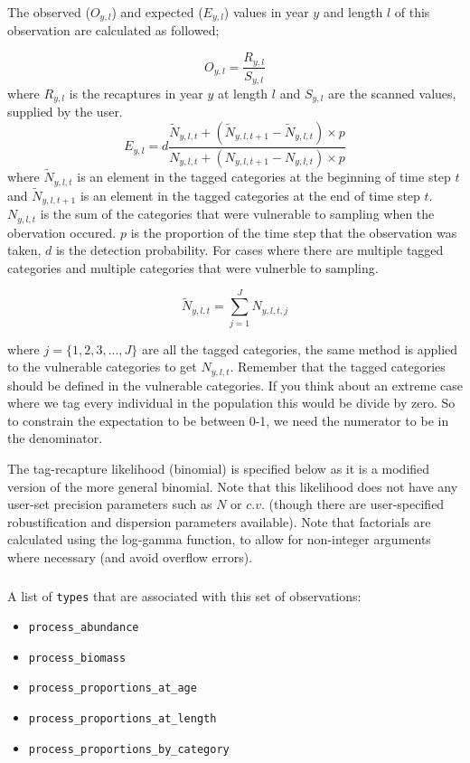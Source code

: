 The observed ($O_{y,l}$) and expected ($E_{y,l}$) values in year $y$ and length $l$ of this observation are calculated as followed;

\begin{equation}
O_{y,l} = \frac{R_{y,l}}{S_{y,l}}
\end{equation}
where $R_{y,l}$ is the recaptures in year $y$ at length $l$ and $S_{y,l}$ are the scanned values, supplied by the user.
\begin{equation}
E_{y,l} = d \frac{\tilde{N}_{y,l,t} +  (\tilde{N}_{y,l,t + 1} - \tilde{N}_{y,l,t}) \times p}
{N_{y,l,t} + (N_{y,l,t+1} - N_{y,l,t}) \times p} 
\end{equation}
where $\tilde{N}_{y,l,t}$ is an element in the tagged categories at the beginning of time step $t$ and $\tilde{N}_{y,l,t + 1}$ is an element in the tagged categories at the end of time step $t$. $N_{y,l,t}$ is the sum of the categories that were vulnerable to sampling when the obervation occured. $p$ is the proportion of the time step that the observation was taken, $d$ is the detection probability. For cases where there are multiple tagged categories and multiple categories that were vulnerble to sampling.

\begin{equation}
	\tilde{N}_{y,l,t} = \sum_{j = 1}^{J} N_{y,l,t,j}
\end{equation}

where $j = \{1,2,3,...,J\}$  are all the tagged categories, the same method is applied to the vulnerable categories to get $N_{y,l,t}$. Remember that the tagged categories should be defined in the vulnerable categories. If you think about an extreme case where we tag every individual in the population this would be divide by zero. So to constrain the expectation to be between 0-1, we need the numerator to be in the denominator.

The tag-recapture likelihood (binomial) is specified below as it is a modified version of the more general binomial. Note that this likelihood does not have any user-set precision parameters such as $N$ or $c.v.$ (though there are user-specified robustification and dispersion parameters available). Note that factorials are calculated using the log-gamma function, to allow for non-integer arguments where necessary (and avoid overflow errors).


\subsubsection{}
A list of \texttt{types} that are associated with this set of observations:
\begin{itemize}
	\item \texttt{process\_abundance}
	\item \texttt{process\_biomass}
	\item \texttt{process\_proportions\_at\_age}
	\item \texttt{process\_proportions\_at\_length}	
	\item \texttt{process\_proportions\_by\_category}				
\end{itemize}

